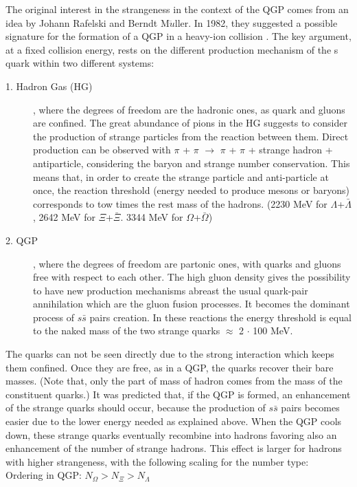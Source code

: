 The original interest in the strangeness in the context of the QGP comes from an idea by Johann Rafelski and Berndt M$\ddot{u}$ller. In 1982, they suggested a possible signature for the formation of a QGP in a heavy-ion collision \cite{cite:strangeness}. The key argument, at a fixed collision energy, rests on the different production mechanism of the s quark within two different systems:
\begin{description}
\item[1. Hadron Gas (HG)], where the degrees of freedom are the hadronic ones, as quark and gluons are confined.
The great abundance of pions in the HG suggests to consider the production of strange particles from the reaction between them.
Direct production can be observed with $\pi$ + $\pi$ $\rightarrow$ $\pi$ + $\pi$ + strange hadron + antiparticle, considering the baryon and strange number conservation. This means that, in order to create the strange particle and anti-particle at once, the reaction threshold (energy needed to produce mesons or baryons) corresponds to tow times the rest mass of the hadrons. (2230 MeV for $\Lambda$+$\bar{\Lambda}$, 2642 MeV for $\Xi$+$\bar{\Xi}$. 3344 MeV for $\Omega$+$\bar{\Omega}$)


\item[2. QGP], where the degrees of freedom are partonic ones, with quarks and gluons free with respect to each other. The high gluon density gives the possibility to have new production mechanisms abreast the usual quark-pair annihilation which are the gluon fusion processes. It becomes the dominant process of $s\bar{s}$ pairs creation. In these reactions the energy threshold is equal to the naked mass of the two strange quarks $\approx$ 2 $\cdot$ 100 MeV.
\end{description}



The quarks can not be seen directly due to the strong interaction which keeps them confined. Once they are free, as in a QGP, the quarks recover their bare masses. (Note that, only the part of mass of hadron comes from the mass of the constituent quarks.)
It was predicted that, if the QGP is formed, an enhancement of the strange quarks should occur, because the production of $s\bar{s}$ pairs becomes easier due to the lower energy needed as explained above. When the QGP cools down, these strange quarks eventually recombine into hadrons favoring also an enhancement of the number of strange hadrons. This effect is larger for hadrons with higher strangeness, with the following scaling for the number type: \\
Ordering in QGP: $N_{\Omega} >  N_{\Xi} > N_{\Lambda}$

